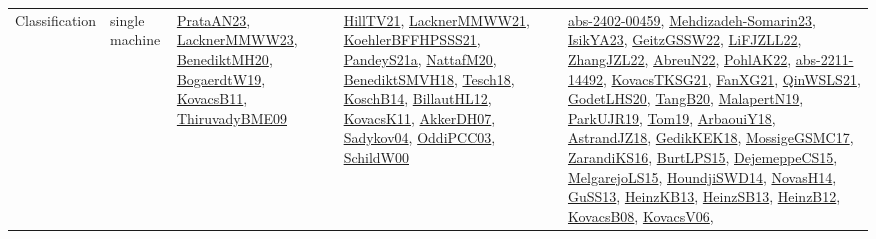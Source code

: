 {\begin{longtable}{lp{3cm}>{\raggedright}p{6cm}>{\raggedright}p{6cm}p{8cm}}
Classification & single machine & \href{articles/PrataAN23.pdf}{PrataAN23}\cite{PrataAN23}, \href{articles/LacknerMMWW23.pdf}{LacknerMMWW23}\cite{LacknerMMWW23}, \href{articles/BenediktMH20.pdf}{BenediktMH20}\cite{BenediktMH20}, \href{papers/BogaerdtW19.pdf}{BogaerdtW19}\cite{BogaerdtW19}, \href{articles/KovacsB11.pdf}{KovacsB11}\cite{KovacsB11}, \href{papers/ThiruvadyBME09.pdf}{ThiruvadyBME09}\cite{ThiruvadyBME09} & \href{papers/HillTV21.pdf}{HillTV21}\cite{HillTV21}, \href{papers/LacknerMMWW21.pdf}{LacknerMMWW21}\cite{LacknerMMWW21}, \href{articles/KoehlerBFFHPSSS21.pdf}{KoehlerBFFHPSSS21}\cite{KoehlerBFFHPSSS21}, \href{articles/PandeyS21a.pdf}{PandeyS21a}\cite{PandeyS21a}, \href{papers/NattafM20.pdf}{NattafM20}\cite{NattafM20}, \href{papers/BenediktSMVH18.pdf}{BenediktSMVH18}\cite{BenediktSMVH18}, \href{papers/Tesch18.pdf}{Tesch18}\cite{Tesch18}, \href{papers/KoschB14.pdf}{KoschB14}\cite{KoschB14}, \href{papers/BillautHL12.pdf}{BillautHL12}\cite{BillautHL12}, \href{articles/KovacsK11.pdf}{KovacsK11}\cite{KovacsK11}, \href{papers/AkkerDH07.pdf}{AkkerDH07}\cite{AkkerDH07}, \href{papers/Sadykov04.pdf}{Sadykov04}\cite{Sadykov04}, \href{papers/OddiPCC03.pdf}{OddiPCC03}\cite{OddiPCC03}, \href{articles/SchildW00.pdf}{SchildW00}\cite{SchildW00} & \href{articles/abs-2402-00459.pdf}{abs-2402-00459}\cite{abs-2402-00459}, \href{papers/Mehdizadeh-Somarin23.pdf}{Mehdizadeh-Somarin23}\cite{Mehdizadeh-Somarin23}, \href{articles/IsikYA23.pdf}{IsikYA23}\cite{IsikYA23}, \href{papers/GeitzGSSW22.pdf}{GeitzGSSW22}\cite{GeitzGSSW22}, \href{papers/LiFJZLL22.pdf}{LiFJZLL22}\cite{LiFJZLL22}, \href{papers/ZhangJZL22.pdf}{ZhangJZL22}\cite{ZhangJZL22}, \href{articles/AbreuN22.pdf}{AbreuN22}\cite{AbreuN22}, \href{articles/PohlAK22.pdf}{PohlAK22}\cite{PohlAK22}, \href{articles/abs-2211-14492.pdf}{abs-2211-14492}\cite{abs-2211-14492}, \href{papers/KovacsTKSG21.pdf}{KovacsTKSG21}\cite{KovacsTKSG21}, \href{articles/FanXG21.pdf}{FanXG21}\cite{FanXG21}, \href{articles/QinWSLS21.pdf}{QinWSLS21}\cite{QinWSLS21}, \href{papers/GodetLHS20.pdf}{GodetLHS20}\cite{GodetLHS20}, \href{papers/TangB20.pdf}{TangB20}\cite{TangB20}, \href{papers/MalapertN19.pdf}{MalapertN19}\cite{MalapertN19}, \href{papers/ParkUJR19.pdf}{ParkUJR19}\cite{ParkUJR19}, \href{papers/Tom19.pdf}{Tom19}\cite{Tom19}, \href{papers/ArbaouiY18.pdf}{ArbaouiY18}\cite{ArbaouiY18}, \href{papers/AstrandJZ18.pdf}{AstrandJZ18}\cite{AstrandJZ18}, \href{articles/GedikKEK18.pdf}{GedikKEK18}\cite{GedikKEK18}, \href{papers/MossigeGSMC17.pdf}{MossigeGSMC17}\cite{MossigeGSMC17}, \href{articles/ZarandiKS16.pdf}{ZarandiKS16}\cite{ZarandiKS16}, \href{papers/BurtLPS15.pdf}{BurtLPS15}\cite{BurtLPS15}, \href{papers/DejemeppeCS15.pdf}{DejemeppeCS15}\cite{DejemeppeCS15}, \href{papers/MelgarejoLS15.pdf}{MelgarejoLS15}\cite{MelgarejoLS15}, \href{papers/HoundjiSWD14.pdf}{HoundjiSWD14}\cite{HoundjiSWD14}, \href{articles/NovasH14.pdf}{NovasH14}\cite{NovasH14}, \href{papers/GuSS13.pdf}{GuSS13}\cite{GuSS13}, \href{papers/HeinzKB13.pdf}{HeinzKB13}\cite{HeinzKB13}, \href{articles/HeinzSB13.pdf}{HeinzSB13}\cite{HeinzSB13}, \href{papers/HeinzB12.pdf}{HeinzB12}\cite{HeinzB12}, \href{articles/KovacsB08.pdf}{KovacsB08}\cite{KovacsB08}, \href{papers/KovacsV06.pdf}{KovacsV06}\cite{KovacsV06}, 
\end{longtable}}
